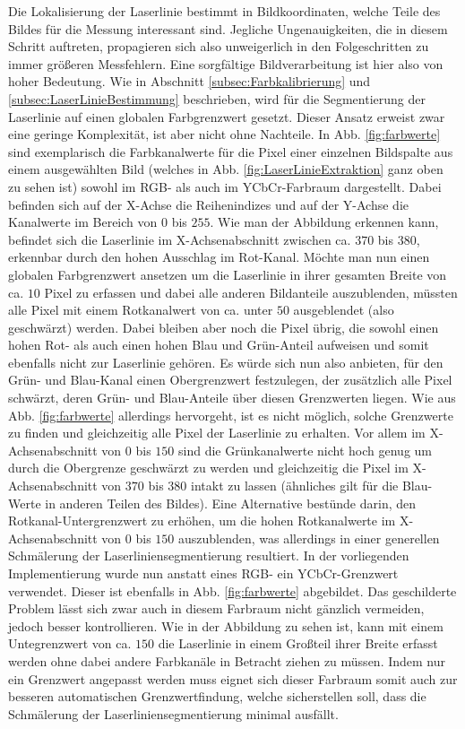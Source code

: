 Die Lokalisierung der Laserlinie bestimmt in Bildkoordinaten, welche Teile des Bildes für die Messung interessant sind. Jegliche Ungenauigkeiten, die in diesem Schritt auftreten, propagieren sich also unweigerlich in den Folgeschritten zu immer größeren Messfehlern. Eine sorgfältige Bildverarbeitung ist hier also von hoher Bedeutung.\bigbreak
Wie in Abschnitt \ref{subsec:Farbkalibrierung} und \ref{subsec:LaserLinieBestimmung} beschrieben, wird für die Segmentierung der Laserlinie auf einen globalen Farbgrenzwert gesetzt. Dieser Ansatz erweist zwar eine geringe Komplexität, ist aber nicht ohne Nachteile. In Abb. \ref{fig:farbwerte} sind exemplarisch die Farbkanalwerte für die Pixel einer einzelnen Bildspalte aus einem ausgewählten Bild (welches in Abb. \ref{fig:LaserLinieExtraktion} ganz oben zu sehen ist) sowohl im RGB- als auch im YCbCr-Farbraum dargestellt. Dabei befinden sich auf der X-Achse die Reihenindizes und auf der Y-Achse die Kanalwerte im Bereich von \(0\) bis \(255\). Wie man der Abbildung erkennen kann, befindet sich die Laserlinie im X-Achsenabschnitt zwischen ca. \(370\) bis \(380\), erkennbar durch den hohen Ausschlag im Rot-Kanal. Möchte man nun einen globalen Farbgrenzwert ansetzen um die Laserlinie in ihrer gesamten Breite von ca. \(10\) Pixel zu erfassen und dabei alle anderen Bildanteile auszublenden, müssten alle Pixel mit einem Rotkanalwert von ca. unter \(50\) ausgeblendet (also geschwärzt) werden. Dabei bleiben aber noch die Pixel übrig, die sowohl einen hohen Rot- als auch einen hohen Blau und Grün-Anteil aufweisen und somit ebenfalls nicht zur Laserlinie gehören. Es würde sich nun also anbieten, für den Grün- und Blau-Kanal einen Obergrenzwert festzulegen, der zusätzlich alle Pixel schwärzt, deren Grün- und Blau-Anteile über diesen Grenzwerten liegen. Wie aus Abb. \ref{fig:farbwerte} allerdings hervorgeht, ist es nicht möglich, solche Grenzwerte zu finden und gleichzeitig alle Pixel der Laserlinie zu erhalten. Vor allem im X-Achsenabschnitt von \(0\) bis \(150\) sind die Grünkanalwerte nicht hoch genug um durch die Obergrenze geschwärzt zu werden und gleichzeitig die Pixel im X-Achsenabschnitt von \(370\) bis \(380\) intakt zu lassen (ähnliches gilt für die Blau-Werte in anderen Teilen des Bildes). Eine Alternative bestünde darin, den Rotkanal-Untergrenzwert zu erhöhen, um die hohen Rotkanalwerte im X-Achsenabschnitt von \(0\) bis \(150\) auszublenden, was allerdings in einer generellen Schmälerung der Laserliniensegmentierung resultiert.\linebreak
In der vorliegenden Implementierung wurde nun anstatt eines RGB- ein YCbCr-Grenzwert verwendet. Dieser ist ebenfalls in Abb. \ref{fig:farbwerte} abgebildet. Das geschilderte Problem lässt sich zwar auch in diesem Farbraum nicht gänzlich vermeiden, jedoch besser kontrollieren. Wie in der Abbildung zu sehen ist, kann mit einem Untegrenzwert von ca. \(150\) die Laserlinie in einem Großteil ihrer Breite erfasst werden ohne dabei andere Farbkanäle in Betracht ziehen zu müssen. Indem nur ein Grenzwert angepasst werden muss eignet sich dieser Farbraum somit auch zur besseren automatischen Grenzwertfindung, welche sicherstellen soll, dass die Schmälerung der Laserliniensegmentierung minimal ausfällt.   
